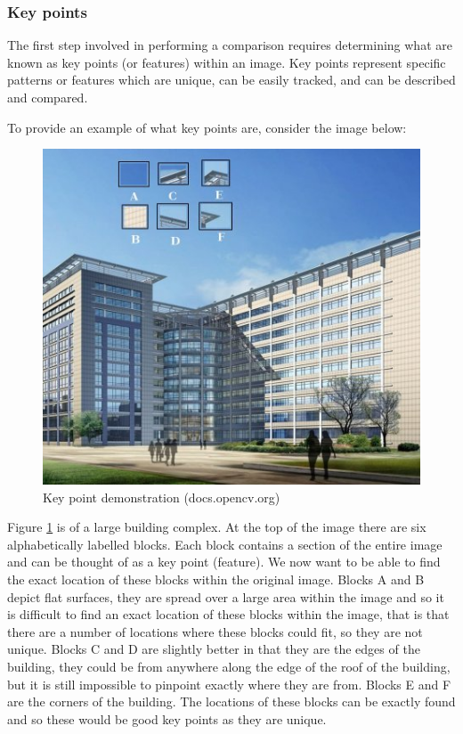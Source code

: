 \documentclass[11pt,a4paper]{report}
\begin{document}
			\subsubsection{Key points}
				The first step involved in performing a comparison requires determining what are known as key points (or features) within an image. Key points represent specific patterns or features which are unique, can be easily tracked, and can be described and compared.
				
				To provide an example of what key points are, consider the image below:
				
				\begin{figure}[H]
					\centering
					\includegraphics[width=1\textwidth]{feature_building}
					\caption[Key points]{Key point demonstration (docs.opencv.org)}
					\label{fig:feature_building}
				\end{figure}
				
				Figure \ref{fig:feature_building} is of a large building complex. At the top of the image there are six alphabetically labelled blocks. Each block contains a section of the entire image and can be thought of as a key point (feature). We now want to be able to find the exact location of these blocks within the original image. 
				Blocks A and B depict flat surfaces, they are spread over a large area within the image and so it is difficult to find an exact location of these blocks within the image, that is that there are a number of locations where these blocks could fit, so they are not unique.
				Blocks C and D are slightly better in that they are the edges of the building, they could be from anywhere along the edge of the roof of the building, but it is still impossible to pinpoint exactly where they are from.
				Blocks E and F are the corners of the building. The locations of these blocks can be exactly found and so these would be good key points as they are unique.
			
\end{document}
